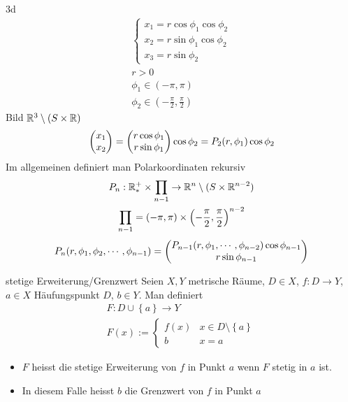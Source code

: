 \begin{Bem}
  3d
  \begin{align*}
    \begin{cases}
      x_1=r\cos \phi_1\cos\phi_2\\
      x_2=r\sin\phi_1\cos\phi_2\\
      x_3=r\sin\phi_2
    \end{cases}\\
    r>0\\
    \phi_1\in\left( -\pi,\pi \right)\\
    \phi_2\in\left( -\frac{\pi}{2},\frac{\pi}{2} \right)
  \end{align*}
  Bild $\mathbb{R}^3\setminus(S\times \mathbb{R})$
  \[\begin{pmatrix}x_1\\x_2\end{pmatrix}=\begin{pmatrix}r\cos\phi_1\\r\sin\phi_1\end{pmatrix}\cos\phi_2=P_2(r,\phi_1)\cos\phi_2\]
  Im allgemeinen definiert man Polarkoordinaten rekursiv
  \begin{gather*}
    P_n:\mathbb{R}^+_*\times\prod_{n-1}\to\mathbb{R}^n\setminus(S\times \mathbb{R}^{n-2})\\
    \prod_{n-1}=(-\pi,\pi)\times\left( -\frac{\pi}{2},\frac{\pi}{2} \right)^{n-2}\\
  \end{gather*}
  \begin{gather*}
    P_n(r,\phi_1,\phi_2,\cdots,\phi_{n-1})=\begin{pmatrix}P_{n-1}(r,\phi_1,\cdots,\phi_{n-2})\cos\phi_{n-1}\\ r\sin\phi_{n-1}\end{pmatrix}
  \end{gather*}
\end{Bem}
\begin{Def}{stetige Erweiterung/Grenzwert}
  Seien $X,Y$ metrische Räume, $D\in X$, $f:D\to Y$, $a\in X$ Häufungspunkt $D$, $b\in Y$. Man definiert
  \begin{gather*}
    F:D\cup \left\{ a \right\}\to Y\\
    F(x):=\begin{cases}
      f(x)&x\in D\setminus \left\{ a \right\}\\
      b&x=a
    \end{cases}
  \end{gather*}
  \begin{itemize}
    \item $F$ heisst die stetige Erweiterung von $f$ in Punkt $a$ wenn $F$ stetig in $a$ ist.
    \item In diesem Falle heisst $b$ die Grenzwert von $f$ in Punkt $a$
  \end{itemize}
\end{Def}
